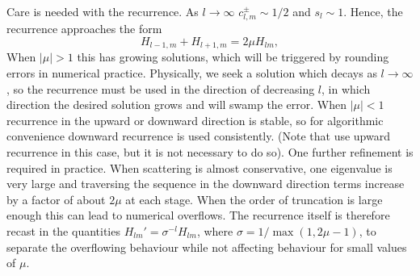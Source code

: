 Care is needed with the recurrence. As $l \rightarrow \infty$ $c_{l,m}^\pm
\sim 1/2$ and $s_l \sim 1$. Hence, the recurrence approaches the form
\begin{equation}
H_{l-1,m}+ H_{l+1,m} =  2 \mu H_{lm}, 
\end{equation}
When $|\mu|> 1$ this has growing solutions, which will be triggered by
rounding errors in numerical practice. Physically, we seek a solution
which decays as $l\rightarrow \infty$, so the recurrence must be used 
in the direction of decreasing $l$, in which direction the desired solution
grows and will swamp the error. When $|\mu|<1$ recurrence in the
upward or downward direction is stable, so for algorithmic convenience 
downward recurrence is used consistently. (Note that \cite{Benassi84} 
use upward recurrence in this case, but it is not necessary to do so).
One further refinement is required in practice. When scattering is 
almost conservative, one eigenvalue is very large and traversing the
sequence in the downward direction terms increase by a factor of about
$2\mu$ at each stage. When the order of truncation is large enough
this can lead to numerical overflows. The recurrence itself is therefore 
recast in the quantities $H_{lm}'=\sigma^{-l} H_{lm}$, where $\sigma=
1/\max(1, 2\mu-1)$, to separate the overflowing behaviour while 
not affecting behaviour for small values of $\mu$.

